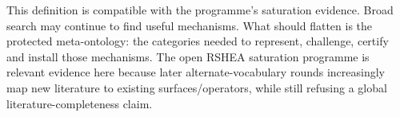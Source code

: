 This definition is compatible with the programme's saturation evidence. Broad search may continue to find useful mechanisms. What should flatten is the protected meta-ontology: the categories needed to represent, challenge, certify and install those mechanisms. The open RSHEA saturation programme is relevant evidence here because later alternate-vocabulary rounds increasingly map new literature to existing surfaces/operators, while still refusing a global literature-completeness claim.
